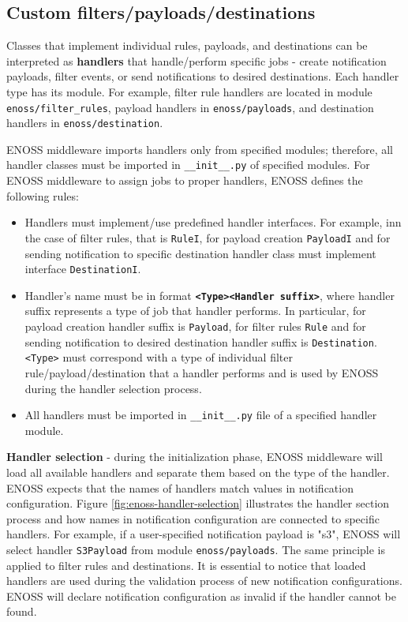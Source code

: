     \subsection{Custom filters/payloads/destinations}

    Classes that implement individual rules, payloads, and destinations can be interpreted as \textbf{handlers} that handle/perform specific jobs - create notification payloads, filter events, or send notifications to desired destinations. Each handler type has its module. For example, filter rule handlers are located in module \texttt{enoss/filter\_rules}, payload handlers in \texttt{enoss/payloads}, and destination handlers in \texttt{enoss/destination}.

    ENOSS middleware imports handlers only from specified modules; therefore, all handler classes must be imported in \texttt{\_\_init\_\_.py} of specified modules. For ENOSS middleware to assign jobs to proper handlers, ENOSS defines the following rules:
    \begin{itemize}
        \item Handlers must implement/use predefined handler interfaces. For example, inn the case of filter rules, that is \texttt{RuleI}, for payload creation \texttt{PayloadI} and for sending notification to specific destination handler class must implement interface \texttt{DestinationI}.
        \item Handler's name must be in format \textbf{\texttt{<Type><Handler suffix>}}, where handler suffix represents a type of job that handler performs. In particular, for payload creation handler suffix is \texttt{Payload}, for filter rules \texttt{Rule} and for sending notification to desired destination handler suffix is \texttt{Destination}. \texttt{<Type>} must correspond with a type of individual filter rule/payload/destination that a handler performs and is used by ENOSS during the handler selection process.
        \item All handlers must be imported in \texttt{\_\_init\_\_.py} file of a specified handler module.
    \end{itemize}

    \textbf{Handler selection} - during the initialization phase, ENOSS middleware will load all available handlers and separate them based on the type of the handler. ENOSS expects that the names of handlers match values in notification configuration. Figure \ref{fig:enoss-handler-selection} illustrates the handler section process and how names in notification configuration are connected to specific handlers. For example,  if a user-specified notification payload is "s3", ENOSS will select handler \texttt{S3Payload} from module \texttt{enoss/payloads}. The same principle is applied to filter rules and destinations. It is essential to notice that loaded handlers are used during the validation process of new notification configurations. ENOSS will declare notification configuration as invalid if the handler cannot be found.

